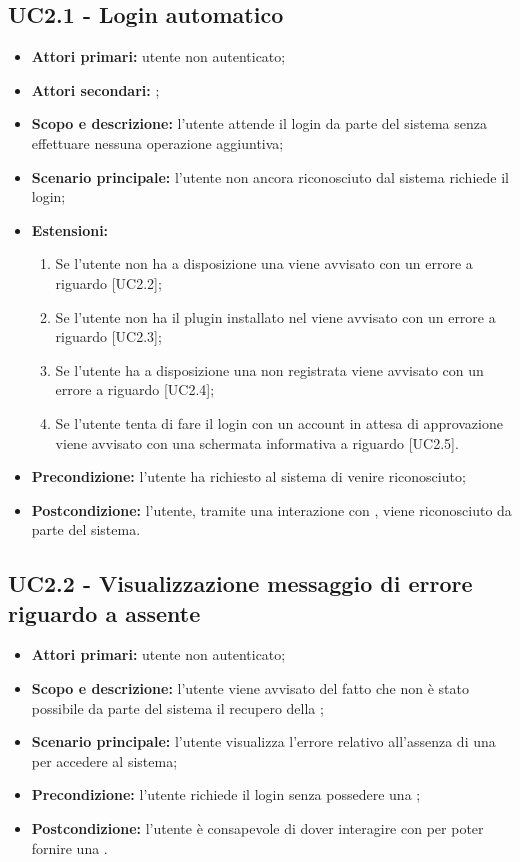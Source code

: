 \documentclass[AnalisiDeiRequisiti.tex]{subfiles}
\begin{document}
\subsection{UC2.1 - Login automatico}
\begin{itemize}
\item \textbf{Attori primari:} utente non autenticato;
\item \textbf{Attori secondari:} ;
\item \textbf{Scopo e descrizione:} l'utente attende il login da parte del sistema senza effettuare nessuna operazione aggiuntiva;
\item \textbf{Scenario principale:} l'utente non ancora riconosciuto dal sistema richiede il login;
\item \textbf{Estensioni:}
\begin{enumerate}
	\item Se l'utente non ha a disposizione una  viene avvisato con un errore a riguardo [UC2.2];
	\item Se l'utente non ha il plugin  installato nel  viene avvisato con un errore a riguardo [UC2.3];
	\item Se l'utente ha a disposizione una  non registrata viene avvisato con un errore a riguardo [UC2.4];
	\item Se l'utente tenta di fare il login con un account in attesa di approvazione viene avvisato con una schermata informativa a riguardo [UC2.5].
\end{enumerate}
\item \textbf{Precondizione:} l'utente ha richiesto al sistema di venire riconosciuto;
\item \textbf{Postcondizione:} l'utente, tramite una interazione con , viene riconosciuto da parte del sistema.
\end{itemize}
\subsection{UC2.2 - Visualizzazione messaggio di errore riguardo a  assente}
\begin{itemize}
	\item \textbf{Attori primari:} utente non autenticato;
	\item \textbf{Scopo e descrizione:} l'utente viene avvisato del fatto che non è stato possibile da parte del sistema il recupero della ;
	\item \textbf{Scenario principale:} l'utente visualizza l'errore relativo all'assenza di una  per accedere al sistema;
	\item \textbf{Precondizione:} l'utente richiede il login senza possedere una ;
	\item \textbf{Postcondizione:} l'utente è consapevole di dover interagire con  per poter fornire una .
\end{itemize}
\end{document}
